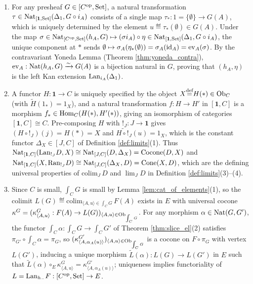 \documentclass[10pt,a4paper]{article}
\begin{document}
\myprf
\begin{enumerate}
\item For any presheaf $G \in [C^{\textrm{op}}, {\textrm{Set}}]$, a natural transformation $\tau \in {\textrm{Nat}}_{[\mathbf{1},{\textrm{Set}}]}(\Delta_1, G \circ i_A)$ consists of a single map $\tau_* : 1 = \{\emptyset\} \to G(A)$, which is uniquely determined by the element $u \eqdef \tau_*(\emptyset) \in G(A)$. Under the map $\sigma \in {\textrm{Nat}}_{[C^{\textrm{op}},{\textrm{Set}}]}(h_A, G) \mapsto (\sigma i_A) \circ \eta \in {\textrm{Nat}}_{[\mathbf{1},{\textrm{Set}}]}(\Delta_1, G \circ i_A)$, the unique component at $*$ sends $\emptyset \mapsto \sigma_A(\eta_*(\emptyset)) = \sigma_A({\textrm{id}}_A) = \mathrm{ev}_A(\sigma)$. By the contravariant Yoneda Lemma (Theorem \ref{thm:yoneda_contra}), $\mathrm{ev}_A : {\textrm{Nat}}(h_A, G) \xrightarrow{\sim} G(A)$ is a bijection natural in $G$, proving that $(h_A, \eta)$ is the left Kan extension ${\mathrm{Lan}}_{i_A}(\Delta_1)$.
\item A functor $H : \mathbf{1} \to C$ is uniquely specified by the object $X {\stackrel{{\textrm{def}}}{=}} H(*) \in {\textrm{Ob}}_C$ (with $\widetilde{H}(1_*) = 1_X$), and a natural transformation $f : H \to H'$ in $[\mathbf{1}, C]$ is a morphism $f_* \in {\textrm{Hom}}_C(H(*), H'(*))$, giving an isomorphism of categories $[\mathbf{1}, C] \cong C$. Pre-composing $H$ with $!_J : J \to \mathbf{1}$ gives $(H \circ !_J)(j) = H(*) = X$ and $\widetilde{H \circ !_J}(u) = 1_X$, which is the constant functor $\Delta_X \in [J, C]$ of Definition \ref{def:limits}(1). Thus ${\textrm{Nat}}_{[\mathbf{1},C]}({\mathrm{Lan}}_{!_J} D, X) \cong {\textrm{Nat}}_{[J,C]}(D, \Delta_X) = {\mathrm{Cocone}}(D, X)$ and ${\textrm{Nat}}_{[\mathbf{1},C]}(X, {\mathrm{Ran}}_{!_J} D) \cong {\textrm{Nat}}_{[J,C]}(\Delta_X, D) = {\mathrm{Cone}}(X, D)$, which are the defining universal properties of $\mathrm{colim}_J\, D$ and $\lim_J D$ in Definition \ref{def:limits}(3)--(4).
\item Since $C$ is small, $\int_C G$ is small by Lemma \ref{lem:cat_of_elements}(1), so the colimit $L(G) \eqdef \mathrm{colim}_{\langle A, u \rangle \in \int_C G}\, F(A)$ exists in $E$ with universal cocone $\kappa^G = (\kappa^G_{\langle A, u \rangle} : F(A) \to L(G))_{\langle A, u \rangle \in {\textrm{Ob}}_{\int_C G}}$. For any morphism $\alpha \in {\textrm{Nat}}(G, G')$, the functor $\int_C \alpha : \int_C G \to \int_C G'$ of Theorem \ref{thm:slice_el}(2) satisfies $\pi_{G'} \circ \int_C \alpha = \pi_G$, so $(\kappa^{G'}_{\langle A, \alpha_A(u) \rangle})_{\langle A, u \rangle \in {\textrm{Ob}}_{\int_C G}}$ is a cocone on $F \circ \pi_G$ with vertex $L(G')$, inducing a unique morphism $\widetilde{L}(\alpha) : L(G) \to L(G')$ in $E$ such that $\widetilde{L}(\alpha) \circ_E \kappa^G_{\langle A, u \rangle} = \kappa^{G'}_{\langle A, \alpha_A(u) \rangle}$; uniqueness implies functoriality of $L = {\mathrm{Lan}}_{h_-} F : [C^{\textrm{op}}, {\textrm{Set}}] \to E$.

\end{enumerate}
\end{document}
